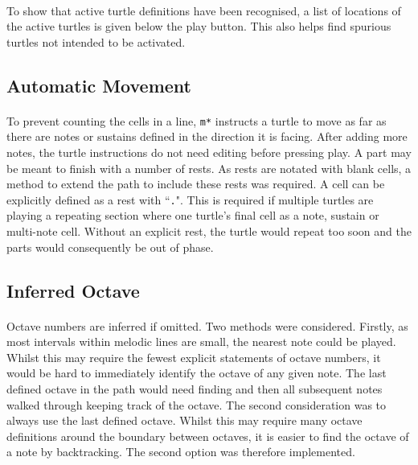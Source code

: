 \paragraph{} To show that active turtle definitions have been recognised, a list of locations of the active turtles is given below the play button. This also helps find spurious turtles not intended to be activated.

\subsection{Automatic Movement}

\paragraph{} To prevent counting the cells in a line, \texttt{m*} instructs a turtle to move as far as there are notes or sustains defined in the direction it is facing. After adding more notes, the turtle instructions do not need editing before pressing play. A part may be meant to finish with a number of rests. As rests are notated with blank cells, a method to extend the path to include these rests was required. A cell can be explicitly defined as a rest with ``\texttt{.}". This is required if multiple turtles are playing a repeating section where one turtle's final cell as a note, sustain or multi-note cell. Without an explicit rest, the turtle would repeat too soon and the parts would consequently be out of phase.

\subsection{Inferred Octave}

\paragraph{} Octave numbers are inferred if omitted. Two methods were considered. Firstly, as most intervals within melodic lines are small, the nearest note could be played.
Whilst this may require the fewest explicit statements of octave numbers, it would be hard to immediately identify the octave of any given note. The last defined octave in the path would need finding and then all subsequent notes walked through keeping track of the octave. The second consideration was to always use the last defined octave. Whilst this may require many octave definitions around the boundary between octaves, it is easier to find the octave of a note by backtracking. The second option was therefore implemented.

